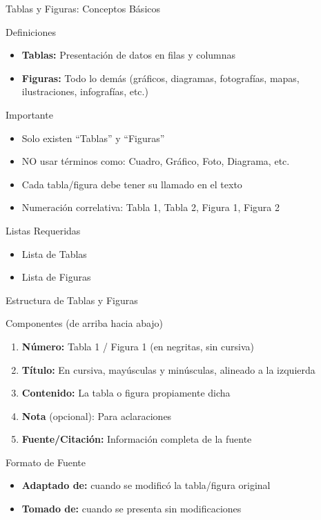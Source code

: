 \documentclass[spanish,aspectratio=169]{beamer}
\begin{document}
\begin{frame}{Tablas y Figuras: Conceptos Básicos}
	\begin{block}{Definiciones}
		\begin{itemize}
			\item \textbf{Tablas:} Presentación de datos en filas y columnas
			\item \textbf{Figuras:} Todo lo demás (gráficos, diagramas, fotografías, mapas, ilustraciones, infografías, etc.)
		\end{itemize}
	\end{block}
	
	\begin{alertblock}{Importante}
		\begin{itemize}
			\item Solo existen ``Tablas'' y ``Figuras''
			\item NO usar términos como: Cuadro, Gráfico, Foto, Diagrama, etc.
			\item Cada tabla/figura debe tener su llamado en el texto
			\item Numeración correlativa: Tabla 1, Tabla 2, Figura 1, Figura 2
		\end{itemize}
	\end{alertblock}
	
	\begin{block}{Listas Requeridas}
		\begin{itemize}
			\item Lista de Tablas
			\item Lista de Figuras
		\end{itemize}
	\end{block}
\end{frame}

\begin{frame}{Estructura de Tablas y Figuras}
	\begin{block}{Componentes (de arriba hacia abajo)}
		\begin{enumerate}
			\item \textbf{Número:} Tabla 1 / Figura 1 (en negritas, sin cursiva)
			\item \textbf{Título:} En cursiva, mayúsculas y minúsculas, alineado a la izquierda
			\item \textbf{Contenido:} La tabla o figura propiamente dicha
			\item \textbf{Nota} (opcional): Para aclaraciones
			\item \textbf{Fuente/Citación:} Información completa de la fuente
		\end{enumerate}
	\end{block}
	
	\begin{alertblock}{Formato de Fuente}
		\begin{itemize}
			\item \textbf{Adaptado de:} cuando se modificó la tabla/figura original
			\item \textbf{Tomado de:} cuando se presenta sin modificaciones
		\end{itemize}
	\end{alertblock}
\end{frame}
\end{document}
